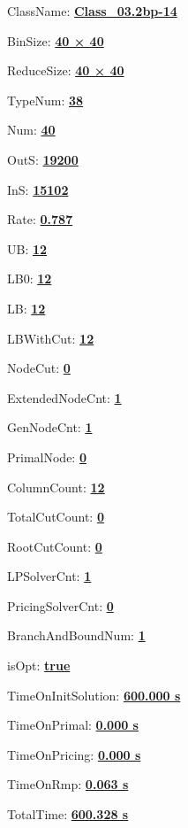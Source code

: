 \documentclass[11pt]{article}
\begin{document}
\pagestyle{empty}


ClassName: \underline{\textbf{Class_03.2bp-14}}
\par
BinSize: \underline{\textbf{40 × 40}}
\par
ReduceSize: \underline{\textbf{40 × 40}}
\par
TypeNum: \underline{\textbf{38}}
\par
Num: \underline{\textbf{40}}
\par
OutS: \underline{\textbf{19200}}
\par
InS: \underline{\textbf{15102}}
\par
Rate: \underline{\textbf{0.787}}
\par
UB: \underline{\textbf{12}}
\par
LB0: \underline{\textbf{12}}
\par
LB: \underline{\textbf{12}}
\par
LBWithCut: \underline{\textbf{12}}
\par
NodeCut: \underline{\textbf{0}}
\par
ExtendedNodeCnt: \underline{\textbf{1}}
\par
GenNodeCnt: \underline{\textbf{1}}
\par
PrimalNode: \underline{\textbf{0}}
\par
ColumnCount: \underline{\textbf{12}}
\par
TotalCutCount: \underline{\textbf{0}}
\par
RootCutCount: \underline{\textbf{0}}
\par
LPSolverCnt: \underline{\textbf{1}}
\par
PricingSolverCnt: \underline{\textbf{0}}
\par
BranchAndBoundNum: \underline{\textbf{1}}
\par
isOpt: \underline{\textbf{true}}
\par
TimeOnInitSolution: \underline{\textbf{600.000 s}}
\par
TimeOnPrimal: \underline{\textbf{0.000 s}}
\par
TimeOnPricing: \underline{\textbf{0.000 s}}
\par
TimeOnRmp: \underline{\textbf{0.063 s}}
\par
TotalTime: \underline{\textbf{600.328 s}}
\par
\newpage


\end{document}
